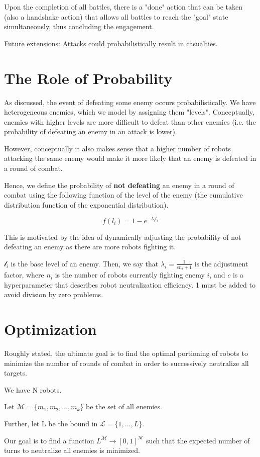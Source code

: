 \documentclass{article}
\theoremstyle{definition}
\begin{document}
Upon the completion of all battles, there is a
"done" action that can be taken (also a handshake action)
that allows all battles to reach
the "goal" state simultaneously, thus
concluding the engagement.

Future extensions: Attacks could probabilistically result
in casualties.

\section{The Role of Probability}

As discussed, the event of defeating some enemy
occurs probabilistically. We have heterogeneous
enemies, which we model by assigning them
"levels". Conceptually, enemies with higher
levels are more difficult to defeat than other
enemies (i.e. the probability of defeating an
enemy in an attack is lower).

However, conceptually it also makes sense that
a higher number of robots attacking the same
enemy would make it more likely that an enemy
is defeated in a round of combat.

Hence, we define the probability of \textbf{not defeating}
an enemy in a round of combat using the following
function of the level of the enemy
(the cumulative distribution function of the
exponential distribution).

$$ f(l_i) = 1 - e^{-\lambda_i l_i} $$

This is motivated by the idea of dynamically adjusting the
probability of not defeating an enemy as there
are more robots fighting it.

$ \mathcal{l}_i $ is the base level of an enemy.
Then, we say that $ \lambda_i = \frac{1}{cn_i + 1} $ is the adjustment
factor, where $ n_i $ is the number of robots
currently fighting enemy $ i $, and $ c $ is a
hyperparameter that describes robot neutralization efficiency.
1 must be added to avoid division by zero problems.

\section{Optimization}

Roughly stated, the ultimate goal is to find the optimal
portioning of robots to minimize the number of rounds of
combat in order to successively neutralize all targets.

\begin{displayquote}

    We have N robots.

    Let $ \mathcal{M} = \{m_1, m_2, \ldots, m_k \} $ be the set of all enemies.

    Further, let L be the bound in $ \mathcal{L} = \{ 1, \ldots, L \} $.

    Our goal is to find a function $ L^\mathcal{M} \to [0,1]^\mathcal{M} $
    such that the expected number of turns to neutralize all enemies
    is minimized.

\end{displayquote}
\end{document}
